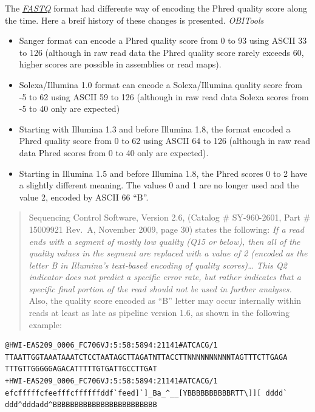 \documentclass[
  letterpaper,
  DIV=11,
  numbers=noendperiod]{scrreprt}
\providecommand{\tightlist}{%
  \setlength{\itemsep}{0pt}\setlength{\parskip}{0pt}}\usepackage{longtable,booktabs,array}
\begin{document}
The \protect\hyperlink{sec-fastq}{\emph{FASTQ}} format had differente
way of encoding the Phred quality score along the time. Here a breif
history of these changes is presented. \emph{OBITools}

\begin{itemize}
\tightlist
\item
  Sanger format can encode a Phred quality score from 0 to 93 using
  ASCII 33 to 126 (although in raw read data the Phred quality score
  rarely exceeds 60, higher scores are possible in assemblies or read
  maps).
\item
  Solexa/Illumina 1.0 format can encode a Solexa/Illumina quality score
  from -5 to 62 using ASCII 59 to 126 (although in raw read data Solexa
  scores from -5 to 40 only are expected)
\item
  Starting with Illumina 1.3 and before Illumina 1.8, the format encoded
  a Phred quality score from 0 to 62 using ASCII 64 to 126 (although in
  raw read data Phred scores from 0 to 40 only are expected).
\item
  Starting in Illumina 1.5 and before Illumina 1.8, the Phred scores 0
  to 2 have a slightly different meaning. The values 0 and 1 are no
  longer used and the value 2, encoded by ASCII 66 ``B''.
\end{itemize}

\begin{quote}
Sequencing Control Software, Version 2.6, (Catalog \# SY-960-2601, Part
\# 15009921 Rev.~A, November 2009, page 30) states the following:
\emph{If a read ends with a segment of mostly low quality (Q15 or
below), then all of the quality values in the segment are replaced with
a value of 2 (encoded as the letter B in Illumina's text-based encoding
of quality scores)\ldots{} This Q2 indicator does not predict a specific
error rate, but rather indicates that a specific final portion of the
read should not be used in further analyses.} Also, the quality score
encoded as ``B'' letter may occur internally within reads at least as
late as pipeline version 1.6, as shown in the following example:
\end{quote}

\begin{verbatim}
@HWI-EAS209_0006_FC706VJ:5:58:5894:21141#ATCACG/1
TTAATTGGTAAATAAATCTCCTAATAGCTTAGATNTTACCTTNNNNNNNNNNTAGTTTCTTGAGA
TTTGTTGGGGGAGACATTTTTGTGATTGCCTTGAT
+HWI-EAS209_0006_FC706VJ:5:58:5894:21141#ATCACG/1
efcfffffcfeefffcffffffddf`feed]`]_Ba_^__[YBBBBBBBBBBRTT\]][ dddd`
ddd^dddadd^BBBBBBBBBBBBBBBBBBBBBBBB
\end{verbatim}
\end{document}
